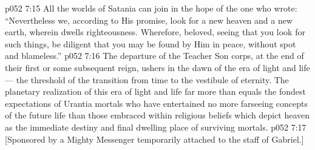 \vs p052 7:15 All the worlds of Satania can join in the hope of the one who wrote: “Nevertheless we, according to His promise, look for a new heaven and a new earth, wherein dwells righteousness. Wherefore, beloved, seeing that you look for such things, be diligent that you may be found by Him in peace, without spot and blameless.”
\vs p052 7:16 \pc The departure of the Teacher Son corps, at the end of their first or some subsequent reign, ushers in the dawn of the era of light and life --- the threshold of the transition from time to the vestibule of eternity. The planetary realization of this era of light and life far more than equals the fondest expectations of Urantia mortals who have entertained no more farseeing concepts of the future life than those embraced within religious beliefs which depict heaven as the immediate destiny and final dwelling place of surviving mortals.
\vsetoff
\vs p052 7:17 [Sponsored by a Mighty Messenger temporarily attached to the staff of Gabriel.]
\quizlink
